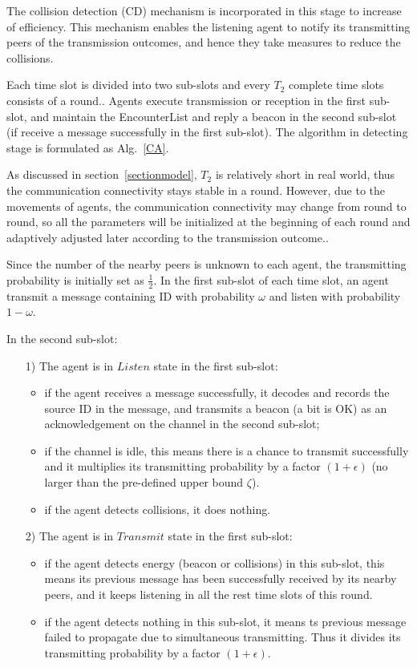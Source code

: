 The collision detection (CD) mechanism is incorporated in this stage 
to increase of efficiency. This mechanism enables the listening agent 
to notify its transmitting peers of the transmission outcomes, 
and hence they take measures to reduce the collisions.

Each time slot is divided into two sub-slots and every 
$T_2$ complete time slots consists of a round.. 
Agents execute transmission or reception in the first sub-slot, 
and maintain the EncounterList and reply a beacon in the second sub-slot (if receive a message 
successfully in the first sub-slot). The algorithm in detecting stage is formulated as Alg.~\ref{CA}.

As discussed in section~\ref{sectionmodel}, $T_2$ is relatively short in 
real world, thus the communication connectivity stays stable in a round. 
However, due to the movements of agents, the communication connectivity
may change from round to round, so all the parameters will be 
initialized at the beginning of each round and adaptively adjusted later 
according to the transmission outcome..

Since the number of the nearby peers is unknown to each agent, 
the transmitting probability is initially set as $\frac{1}{2}$.
In the first sub-slot of each time slot, an agent transmit a message containing ID 
with probability $\omega$ and listen with probability $1 - \omega$. 

In the second sub-slot: 
\begin{itemize}
    \item[1)] The agent is in $Listen$ state in the first sub-slot:
    \begin{itemize}
    \item if the agent receives a message successfully, it 
    decodes and records the source ID in the message, and
    transmits a beacon (a bit is OK) as an acknowledgement 
    on the channel in the second sub-slot; 
    \item if the channel is idle, this means there is a chance to 
    transmit successfully and it multiplies its transmitting 
    probability by a factor $(1+\epsilon)$ (no larger than the pre-defined
    upper bound $\zeta$).
    \item if the agent detects collisions, it does nothing.
    \end{itemize}
    \item[2)] The agent is in $Transmit$ state in the first sub-slot:
    \begin{itemize}
    \item if the agent detects energy (beacon or collisions) in this sub-slot,
    this means its previous message has been successfully received by its nearby
    peers, and it keeps listening in all the rest time slots of this round.
    \item if the agent detects nothing in this sub-slot, it means ts previous message
    failed to propagate due to simultaneous transmitting. Thus it divides its transmitting 
    probability by a factor $(1+\epsilon)$. 
    \end{itemize}
\end{itemize}


